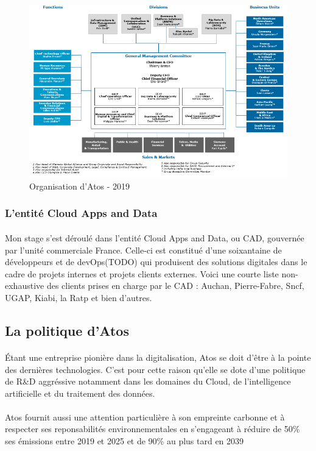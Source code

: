 \documentclass[12pt]{article}
\begin{document}
\begin {sloppypar}
\begin{figure}[h]
  \includegraphics[width=\textwidth] {orga_atos.png}
  \caption {Organisation d'Atos - 2019 }
\end{figure}

\subsubsection{L'entité Cloud Apps and Data}
\paragraph{}
Mon stage s'est déroulé dans l'entité Cloud Apps and Data, ou CAD, gouvernée par 
l'unité commerciale France. Celle-ci est constitué d'une soixantaine de développeurs et de devOps(TODO) qui produisent 
des solutions digitales dans le cadre de projets internes et projets clients externes.
Voici une courte liste non-exhaustive des clients prises en charge par le CAD : Auchan, Pierre-Fabre, Sncf, UGAP, Kiabi,
 la Ratp et bien d'autres.

\subsection{La politique d'Atos}
\paragraph{}
Étant une entreprise pionière dans la digitalisation, Atos se doit d'être à la pointe
des dernières technologies. C'est pour cette raison qu'elle se dote d'une politique 
de R\&D aggréssive notamment dans les domaines du Cloud, de l'intelligence artificielle 
et du traitement des données.
\paragraph{}
Atos fournit aussi une attention particulière à son empreinte carbonne et à respecter ses reponsabilités environnementales
en s'engageant à réduire de 50\% ses émissions entre 2019 et 2025 et de 90\% au plus tard en 2039 
\newpage

\end{sloppypar}
\end{document}
